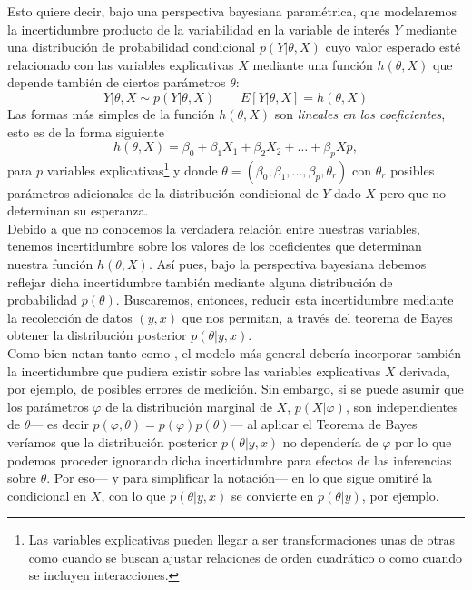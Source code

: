 Esto quiere decir, bajo una perspectiva bayesiana paramétrica, que modelaremos la incertidumbre producto de la variabilidad en la variable de interés $Y$ mediante una distribución de probabilidad condicional $p(Y|\theta,X)$ cuyo valor esperado esté relacionado con las variables explicativas $X$ mediante una función $h(\theta,X)$ que depende también de ciertos parámetros $\theta$: 
\begin{equation} \label{eq:regr_gral}
Y|\theta,X \sim p(Y|\theta,X) \qquad E[Y|\theta,X] = h(\theta,X)
\end{equation} 
Las formas más simples de la función $h(\theta,X)$ son \textit{lineales en los coeficientes}, esto es de la forma siguiente 
\begin{equation*}
h(\theta,X) = \beta_0 + \beta_1X_1 + \beta_2X_2 + \dots + \beta_pXp, 
\end{equation*}
para $p$ variables explicativas\footnote{Las variables explicativas pueden llegar a ser transformaciones unas de otras como cuando se buscan ajustar relaciones de orden cuadrático o como cuando se incluyen interacciones.} y donde $\theta = (\beta_0,\beta_1,\dots,\beta_p,\theta_r)$ con $\theta_r$ posibles parámetros adicionales de la distribución condicional de $Y$ dado $X$ pero que no determinan su esperanza.\\

Debido a que no conocemos la verdadera relación entre nuestras variables, tenemos incertidumbre sobre los valores de los coeficientes que determinan nuestra función $h(\theta ,X)$. Así pues, bajo la perspectiva bayesiana debemos reflejar dicha incertidumbre también mediante alguna distribución de probabilidad $p(\theta)$. Buscaremos, entonces, reducir esta incertidumbre mediante la recolección de datos $(y,x)$ que nos permitan, a través del teorema de Bayes obtener la distribución posterior $p(\theta|y,x)$.\\

Como bien notan tanto \textcite[354]{Gelman13} como \textcite[111]{Congdon06}, el modelo más general debería incorporar también la incertidumbre que pudiera existir sobre las variables explicativas $X$ derivada, por ejemplo, de posibles errores de medición. Sin embargo, si se puede asumir que los parámetros $\varphi$ de la distribución marginal de $X$, $p(X|\varphi)$, son independientes de $\theta$--- es decir $p(\varphi,\theta)=p(\varphi)p(\theta)$--- al aplicar el Teorema de Bayes veríamos que la distribución posterior $p(\theta|y,x)$ no dependería de $\varphi$ por lo que podemos proceder ignorando dicha incertidumbre para efectos de las inferencias sobre $\theta$. Por eso--- y para simplificar la notación--- en lo que sigue omitiré la condicional en $X$, con lo que $p(\theta|y,x)$ se convierte en $p(\theta|y)$, por ejemplo. \\

